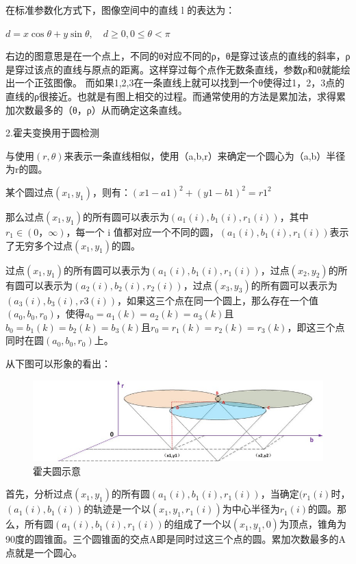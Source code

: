 在标准参数化方式下，图像空间中的直线 l 的表达为：

$d=x \cos \theta+y \sin \theta, \quad d \geqslant 0,0 \leqslant \theta<\pi$

右边的图意思是在一个点上，不同的θ对应不同的ρ，θ是穿过该点的直线的斜率，ρ是穿过该点的直线与原点的距离。这样穿过每个点作无数条直线，参数ρ和θ就能绘出一个正弦图像。 ⽽如果1,2,3在一条直线上就可以找到⼀个θ使得过1，2，3点的直线的ρ很接近。也就是有图上相交的过程。而通常使用的方法是累加法，求得累加次数最多的（θ，ρ）从⽽确定这条直线。

2.霍夫变换用于圆检测

与使用$(r, \theta)$来表示一条直线相似，使用（a,b,r）来确定一个圆心为（a,b）半径为r的圆。

某个圆过点$(x_{1}, y_{1})$，则有：$(x1-a1)^2 + (y1-b1)^2 = r1^2$

那么过点$(x_{1}, y_{1})$的所有圆可以表示为$(a_{1}(i), b_{1}(i), r_{1}(i))$，其中$r_{1} \in (0，\infty)$，每⼀个 i 值都对应⼀个不同的圆，$(a_{1}(i), b_{1}(i), r_{1}(i))$表示了无穷多个过点$(x_{1}, y_{1})$的圆。

过点$(x_{1}, y_{1})$的所有圆可以表示为$(a_{1}(i), b_{1}(i),r_{1}(i))$，过点$(x_{2}, y_{2})$的所有圆可以表示为$(a_{2}(i),b_{2}(i),r_{2}(i))$，过点$(x_{3}, y_{3})$的所有圆可以表示为$(a_{3}(i),b_{3}(i),r3(i))$，如果这三个点在同一个圆上，那么存在一个值$(a_{0},b_{0},r_{0})$，使得$a_{0} = a_{1}(k) = a_{2}(k) = a_{3}(k)$且$b_{0} = b_{1}(k) = b_{2}(k) = b_{3}(k)$且$r_{0} = r_{1}(k) = r_{2}(k) = r_{3}(k)$，即这三个点同时在圆$(a_{0}, b_{0}, r_{0})$上。

从下图可以形象的看出：

\begin{figure}[ht]
  \centering
  \includegraphics[width=0.8\linewidth]{./Figure/Hough_Circle.png}
  \caption{霍夫圆示意}\label{Fig:xd1}
\end{figure}

⾸先，分析过点$(x_{1}, y_{1})$的所有圆$(a_{1}(i), b_{1}(i),r_{1}(i))$，当确定$(r_{1}(i)$时，$(a_{1}(i), b_{1}(i))$的轨迹是⼀个以$(x_{1}, y_{1}, r_{1}(i))$为中心半径为$r_{1}(i)$的圆。那么，所有圆$(a_{1}(i), b_{1}(i),r_{1}(i))$的组成了一个以$(x_{1}, y_{1}, 0)$为顶点，锥角为90度的圆锥面。三个圆锥面的交点A即是同时过这三个点的圆。累加次数最多的A点就是一个圆⼼。

